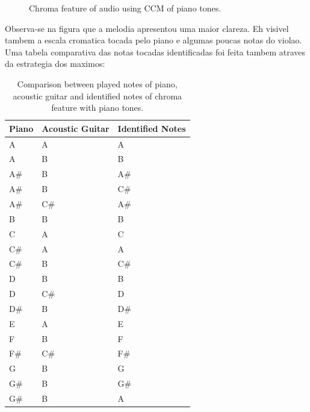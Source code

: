 \documentclass{article}
\begin{document}
	\begin{figure}[h]
	 \centerline{}
	 \caption{Chroma feature of audio using CCM of piano tones.}
	 \label{fig:2-ccm-piano}
	\end{figure}	

	Observa-se na figura  que a melodia apresentou uma maior clareza. Eh visivel tambem a escala cromatica tocada pelo piano e algumas poucas notas do violao. Uma tabela comparativa das notas tocadas identificadas foi feita tambem atraves da estrategia dos maximos:

	\begin{table}[h]
	 \begin{center}
	 \begin{tabular}{|l|l|l|}
	  \hline
	  Piano & Acoustic Guitar & Identified Notes \\
	  \hline
		A	& A	& A \\
		A	&    B	&    B \\
		A\#	&    B	&    A\# \\
		A\#	&    B	&    C\# \\
		A\#	&    C\#	&    A\# \\
		B	&    B	&    B \\
		C	&    A	&    C \\
		C\#	&    A	&    A \\
		C\#	&    B	&    C\# \\
		D	&    B	&    B \\
		D	&    C\#	&    D \\
		D\#	&    B	&    D\# \\
		E	&    A	&    E \\
		F	&    B	&    F \\
		F\#	&    C\#	&    F\# \\
		G	&    B	&    G \\
		G\#	&    B	&    G\# \\
		G\#	&    B	&    A \\
	  \hline
	 \end{tabular}
	\end{center}
	 \caption{Comparison between played notes of piano, acoustic guitar and identified notes of chroma feature with piano tones.}
	 \label{tab:table-2-ccm-piano}
	\end{table}
\end{document}

